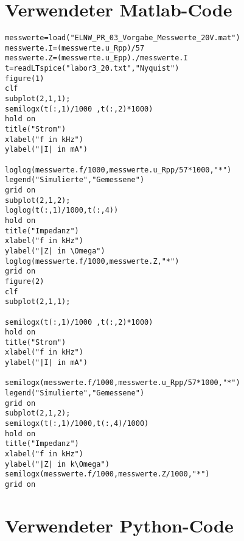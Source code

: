 %
\section{Verwendeter Matlab-Code}
\label{app:Matlab}
%
\begin{verbatim}
messwerte=load("ELNW_PR_03_Vorgabe_Messwerte_20V.mat")
messwerte.I=(messwerte.u_Rpp)/57
messwerte.Z=(messwerte.u_Epp)./messwerte.I
t=readLTspice("labor3_20.txt","Nyquist")
figure(1)
clf
subplot(2,1,1);
semilogx(t(:,1)/1000 ,t(:,2)*1000)
hold on
title("Strom")
xlabel("f in kHz")
ylabel("|I| in mA")

loglog(messwerte.f/1000,messwerte.u_Rpp/57*1000,"*")
legend("Simulierte","Gemessene")
grid on
subplot(2,1,2);
loglog(t(:,1)/1000,t(:,4))
hold on
title("Impedanz")
xlabel("f in kHz")
ylabel("|Z| in \Omega")
loglog(messwerte.f/1000,messwerte.Z,"*")
grid on
figure(2)
clf
subplot(2,1,1);

semilogx(t(:,1)/1000 ,t(:,2)*1000)
hold on
title("Strom")
xlabel("f in kHz")
ylabel("|I| in mA")

semilogx(messwerte.f/1000,messwerte.u_Rpp/57*1000,"*")
legend("Simulierte","Gemessene")
grid on
subplot(2,1,2);
semilogx(t(:,1)/1000,t(:,4)/1000)
hold on
title("Impedanz")
xlabel("f in kHz")
ylabel("|Z| in k\Omega")
semilogx(messwerte.f/1000,messwerte.Z/1000,"*")
grid on
\end{verbatim}

\section{Verwendeter Python-Code}
\label{app:Python}
\inputminted{python}{src/test.py}
%
%
%
%
\begin{flushright}
  \textit{\autorA}
\end{flushright}
%
%
%
%
%
%
%
%
%
%
%